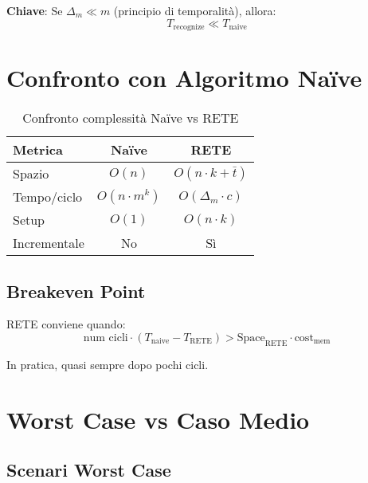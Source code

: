 \textbf{Chiave}: Se $\Delta_m \ll m$ (principio di temporalità), allora:
\begin{equation}
T_{\text{recognize}} \ll T_{\text{naive}}
\end{equation}

\section{Confronto con Algoritmo Naïve}

\begin{table}[h]
\centering
\begin{tabular}{@{}lcc@{}}
\toprule
\textbf{Metrica} & \textbf{Naïve} & \textbf{RETE} \\
\midrule
Spazio & $O(n)$ & $O(n \cdot k + \bar{t})$ \\
Tempo/ciclo & $O(n \cdot m^k)$ & $O(\Delta_m \cdot c)$ \\
Setup & $O(1)$ & $O(n \cdot k)$ \\
Incrementale & No & Sì \\
\bottomrule
\end{tabular}
\caption{Confronto complessità Naïve vs RETE}
\end{table}

\subsection{Breakeven Point}

RETE conviene quando:
\begin{equation}
\text{num cicli} \cdot (T_{\text{naive}} - T_{\text{RETE}}) > \text{Space}_{\text{RETE}} \cdot \text{cost}_{\text{mem}}
\end{equation}

In pratica, quasi sempre dopo pochi cicli.

\section{Worst Case vs Caso Medio}

\subsection{Scenari Worst Case}

